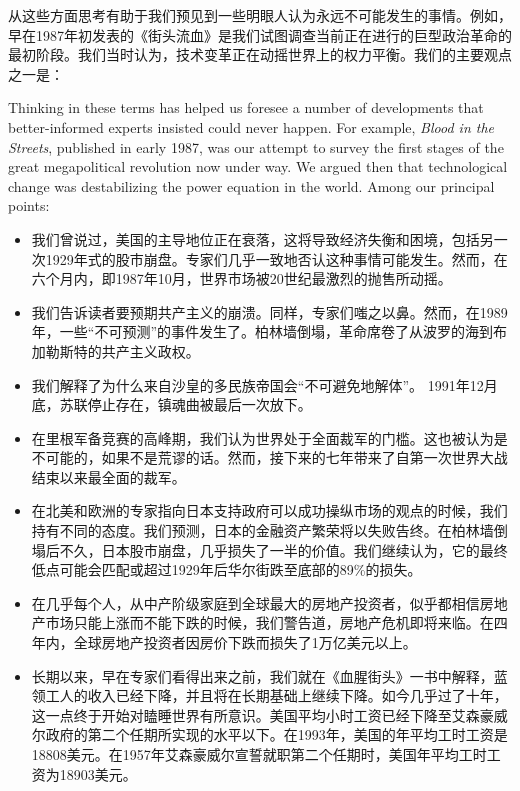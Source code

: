 \begin{paracol}{2}
\switchcolumn*
从这些方面思考有助于我们预见到一些明眼人认为永远不可能发生的事情。例如，早在1987年初发表的《街头流血》是我们试图调查当前正在进行的巨型政治革命的最初阶段。我们当时认为，技术变革正在动摇世界上的权力平衡。我们的主要观点之一是：

\switchcolumn
Thinking in these terms has helped us foresee a number of developments that better-informed experts insisted could never happen. For example, \emph{Blood in the Streets}, published in early 1987, was our attempt to survey the first stages of the great megapolitical revolution now under way. We argued then that technological change was destabilizing the power equation in the world. Among our principal points:

\switchcolumn*
\begin{itemize}
\item 我们曾说过，美国的主导地位正在衰落，这将导致经济失衡和困境，包括另一次1929年式的股市崩盘。专家们几乎一致地否认这种事情可能发生。然而，在六个月内，即1987年10月，世界市场被20世纪最激烈的抛售所动摇。
\item 我们告诉读者要预期共产主义的崩溃。同样，专家们嗤之以鼻。然而，在1989年，一些“不可预测”的事件发生了。柏林墙倒塌，革命席卷了从波罗的海到布加勒斯特的共产主义政权。
\item 我们解释了为什么来自沙皇的多民族帝国会“不可避免地解体”。 1991年12月底，苏联停止存在，镇魂曲被最后一次放下。
\item 在里根军备竞赛的高峰期，我们认为世界处于全面裁军的门槛。这也被认为是不可能的，如果不是荒谬的话。然而，接下来的七年带来了自第一次世界大战结束以来最全面的裁军。
\item 在北美和欧洲的专家指向日本支持政府可以成功操纵市场的观点的时候，我们持有不同的态度。我们预测，日本的金融资产繁荣将以失败告终。在柏林墙倒塌后不久，日本股市崩盘，几乎损失了一半的价值。我们继续认为，它的最终低点可能会匹配或超过1929年后华尔街跌至底部的89\%的损失。
\item 在几乎每个人，从中产阶级家庭到全球最大的房地产投资者，似乎都相信房地产市场只能上涨而不能下跌的时候，我们警告道，房地产危机即将来临。在四年内，全球房地产投资者因房价下跌而损失了1万亿美元以上。
\item 长期以来，早在专家们看得出来之前，我们就在《血腥街头》一书中解释，蓝领工人的收入已经下降，并且将在长期基础上继续下降。如今几乎过了十年，这一点终于开始对瞌睡世界有所意识。美国平均小时工资已经下降至艾森豪威尔政府的第二个任期所实现的水平以下。在1993年，美国的年平均工时工资是18808美元。在1957年艾森豪威尔宣誓就职第二个任期时，美国年平均工时工资为18903美元。
\end{itemize}


\end{paracol}
